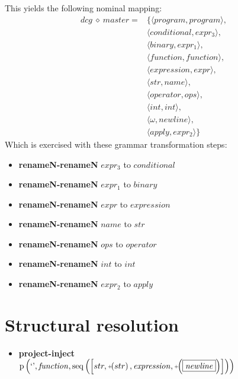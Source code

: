 This yields the following nominal mapping:
\begin{align*}\mathit{dcg} \:\diamond\: \mathit{master} =& \{\langle \mathit{program},\mathit{program}\rangle,\\
 & \langle \mathit{conditional},\mathit{expr_3}\rangle,\\
 & \langle \mathit{binary},\mathit{expr_1}\rangle,\\
 & \langle \mathit{function},\mathit{function}\rangle,\\
 & \langle \mathit{expression},\mathit{expr}\rangle,\\
 & \langle str,\mathit{name}\rangle,\\
 & \langle \mathit{operator},\mathit{ops}\rangle,\\
 & \langle int,\mathit{int}\rangle,\\
 & \langle \omega,\mathit{newline}\rangle,\\
 & \langle \mathit{apply},\mathit{expr_2}\rangle\}\end{align*}
 Which is exercised with these grammar transformation steps:

{\footnotesize\begin{itemize}
\item \textbf{renameN-renameN} $\mathit{expr_3}$ to $\mathit{conditional}$
\item \textbf{renameN-renameN} $\mathit{expr_1}$ to $\mathit{binary}$
\item \textbf{renameN-renameN} $\mathit{expr}$ to $\mathit{expression}$
\item \textbf{renameN-renameN} $\mathit{name}$ to $str$
\item \textbf{renameN-renameN} $\mathit{ops}$ to $\mathit{operator}$
\item \textbf{renameN-renameN} $\mathit{int}$ to $int$
\item \textbf{renameN-renameN} $\mathit{expr_2}$ to $\mathit{apply}$
\end{itemize}}

\section{Structural resolution}
{\footnotesize\begin{itemize}
\item \textbf{project-inject}\\$\mathrm{p}\left(\text{`'},\mathit{function},\mathrm{seq}\left(\left[str, \plus \left(str\right), \mathit{expression}, \plus \left(\fbox{$\mathit{newline}$}\right)\right]\right)\right)$
\end{itemize}}
